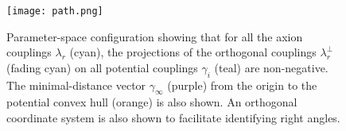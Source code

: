 \documentclass[11pt]{article}
\begin{document}
\begin{figure}[h]
    \centering
    \texttt{[image: path.png]} %
    \caption{Parameter-space configuration showing that for all the axion couplings $\lambda_{r}$ (cyan), the projections of the orthogonal couplings $\lambda^{\perp}_{r}$ (fading cyan) on all potential couplings $\gamma_{i}$ (teal) are non-negative. The minimal-distance vector $\gamma_{\infty}$ (purple) from the origin to the potential convex hull (orange) is also shown. An orthogonal coordinate system is also shown to facilitate identifying right angles.}
    \label{fig:parameter_space}
\end{figure}
\end{document}
